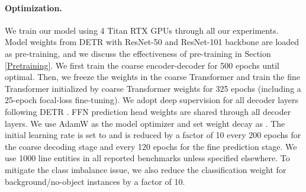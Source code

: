 \documentclass[final]{cvpr}
\begin{document}
\paragraph{Optimization.} We train our model using 4 Titan RTX GPUs through all our experiments. Model weights from DETR \cite{carion2020end} with ResNet-50 and ResNet-101 backbone are loaded as pre-training, and we discuss the effectiveness of pre-training in Section \ref{Pretraining}. We first train the coarse encoder-decoder for 500 epochs until optimal. Then, we freeze the weights in the coarse Transformer and train the fine Transformer initialized by coarse Transformer weights for 325 epochs (including a 25-epoch focal-loss fine-tuning). We adopt deep supervision \cite{lee2015deeply,xie2015holistically} for all decoder layers following DETR \cite{carion2020end}. FFN prediction head weights are shared through all decoder layers. We use AdamW as the model optimizer and set weight decay as . The initial learning rate is set to  and is reduced by a factor of 10 every 200 epochs for the coarse decoding stage and every 120 epochs for the fine prediction stage. We use 1000 line entities in all reported benchmarks unless specified elsewhere. To mitigate the class imbalance issue, we also reduce the classification weight for background/no-object instances by a factor of 10. 
\end{document}
